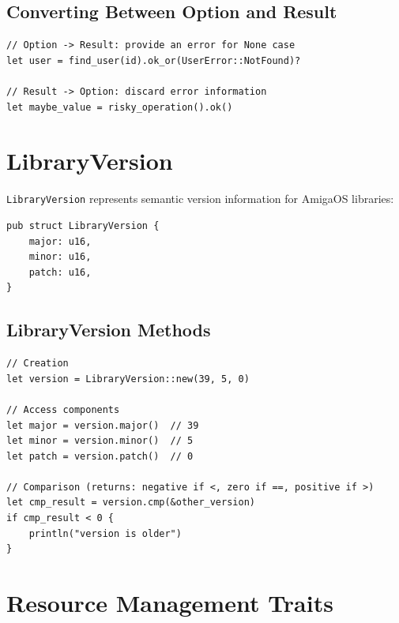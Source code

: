 \subsection{Converting Between Option and Result}

\begin{lstlisting}
// Option -> Result: provide an error for None case
let user = find_user(id).ok_or(UserError::NotFound)?

// Result -> Option: discard error information
let maybe_value = risky_operation().ok()
\end{lstlisting}

\section{LibraryVersion}
\label{sec:library-version}

\texttt{LibraryVersion} represents semantic version information for AmigaOS libraries:

\begin{lstlisting}
pub struct LibraryVersion {
    major: u16,
    minor: u16,
    patch: u16,
}
\end{lstlisting}

\subsection{LibraryVersion Methods}

\begin{lstlisting}
// Creation
let version = LibraryVersion::new(39, 5, 0)

// Access components
let major = version.major()  // 39
let minor = version.minor()  // 5
let patch = version.patch()  // 0

// Comparison (returns: negative if <, zero if ==, positive if >)
let cmp_result = version.cmp(&other_version)
if cmp_result < 0 {
    println("version is older")
}
\end{lstlisting}

\section{Resource Management Traits}
\label{sec:resource-traits}

